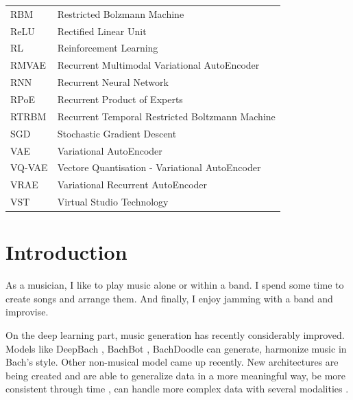 \documentclass[12pt]{report}
\begin{document}
\begin{center}
\begin{longtable}{ll}
        RBM & Restricted Bolzmann Machine \\
        ReLU & Rectified Linear Unit \\
        RL & Reinforcement Learning \\
        RMVAE & Recurrent Multimodal Variational AutoEncoder \\
        RNN & Recurrent Neural Network \\
        RPoE & Recurrent Product of Experts \\
        RTRBM & Recurrent Temporal Restricted Boltzmann Machine \\
        SGD & Stochastic Gradient Descent \\
        VAE & Variational AutoEncoder \\
        VQ-VAE & Vectore Quantisation - Variational AutoEncoder \\
        VRAE & Variational Recurrent AutoEncoder \\
        VST & Virtual Studio Technology
    \end{longtable}
    
\end{center}
\newpage




\chapter{Introduction}

As a musician, I like to play music alone or within a band.
I spend some time to create songs and arrange them. And finally, I enjoy jamming with a band and improvise.

On the deep learning part, music generation has recently considerably improved.
Models like DeepBach \cite{hadjeres_deepbach:_2016}, BachBot \cite{liang_automatic_2017}, BachDoodle \cite{huang_bach_2019} can generate, harmonize music in Bach's style.
Other non-musical model came up recently.
New architectures are being created and are able to generalize data in a more meaningful way, be more consistent through time \cite{vaswani_attention_2017}, can handle more complex data with several modalities \cite{wu_multimodal_2018-1, tan_factorized_2019}.
\end{document}
